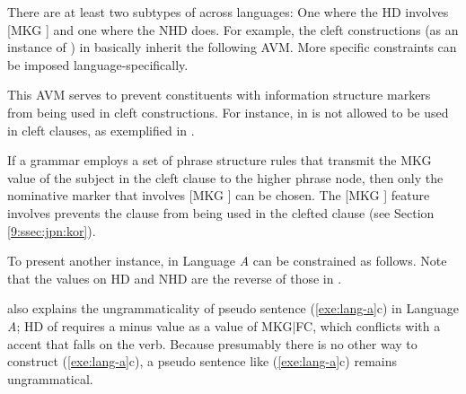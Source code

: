There are at least two subtypes of  across languages:
One where the HD involves [MKG ] and one where the NHD does.
For example, the cleft constructions (as an instance of
) in  basically inherit the following
AVM. More specific constraints can be imposed
language-specifically.


\noindent This AVM serves to prevent constituents with information
structure markers from being used in cleft constructions. For
instance, \nun in  is not allowed to be used in cleft
clauses, as exemplified in .



\noindent If a grammar employs a set of phrase structure rules that
transmit the MKG value of the subject in the cleft clause to the
higher phrase node, then only the nominative marker that involves [MKG
  ] can be chosen.  The [MKG ] feature \nun
involves prevents the clause from being used in the clefted clause (see
Section \ref{9:ssec:jpn:kor}).


To present another instance,  in Language \textit{A}
can be constrained as follows. Note that the values on HD and NHD are
the reverse of those in .


\noindent {} also explains the ungrammaticality
of pseudo sentence (\ref{exe:lang-a}c) in Language \textit{A}; HD of
 requires a minus value as a value of MKG{$\mid$}FC,
which conflicts with a  accent that falls on the verb. Because
presumably there is no other way to construct (\ref{exe:lang-a}c), a
pseudo sentence like (\ref{exe:lang-a}c) remains ungrammatical.

